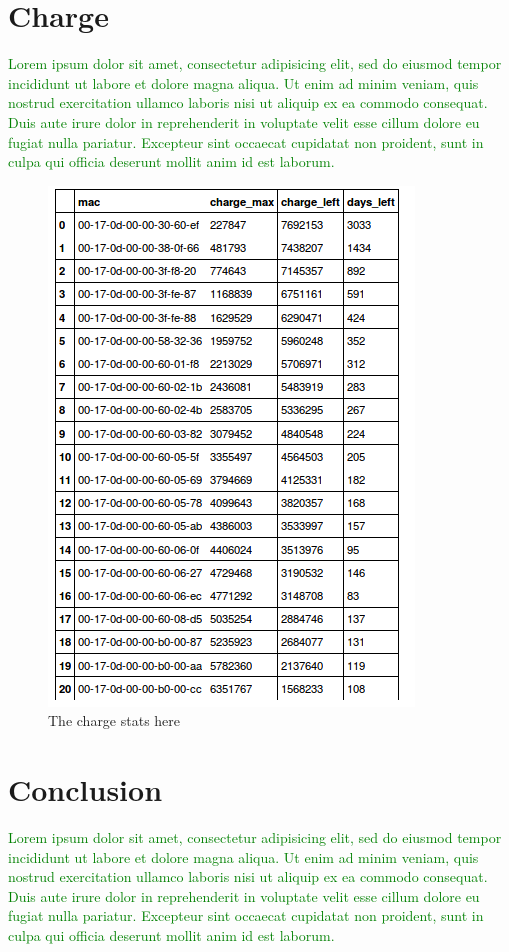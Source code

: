 \documentclass{sig-alternate}
\newcommand{\lorem}               {\textcolor{green}{Lorem ipsum dolor sit amet, consectetur adipisicing elit, sed do eiusmod tempor incididunt ut labore et dolore magna aliqua. Ut enim ad minim veniam, quis nostrud exercitation ullamco laboris nisi ut aliquip ex ea commodo consequat. Duis aute irure dolor in reprehenderit in voluptate velit esse cillum dolore eu fugiat nulla pariatur. Excepteur sint occaecat cupidatat non proident, sunt in culpa qui officia deserunt mollit anim id est laborum.}}
\begin{document}
\section{Charge}
\label{sec:charge}


\lorem

\begin{figure}
    \centering
    \includegraphics[width=\columnwidth]{stats_charge}
    \caption{The charge stats here}
    \label{fig:stats_charge}
\end{figure}


\section{Conclusion}
\label{sec:conclusion}


\lorem




\end{document}
